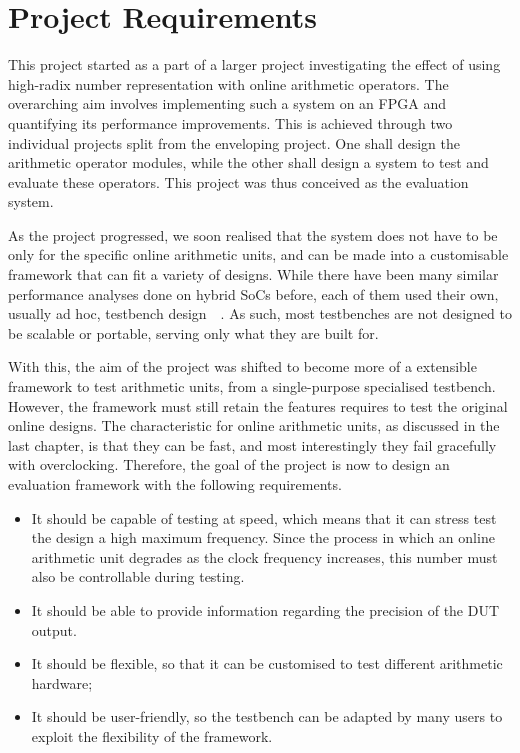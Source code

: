 \chapter{Project Requirements}

This project started as a part of a larger project investigating the effect of using high-radix number representation with online arithmetic operators.
The overarching aim involves implementing such a system on an FPGA and quantifying its performance improvements.
This is achieved through two individual projects split from the enveloping project.
One shall design the arithmetic operator modules, while the other shall design a system to test and evaluate these operators.
This project was thus conceived as the evaluation system.

As the project progressed, we soon realised that the system does not have to be only for the specific online arithmetic units, and can be made into a customisable framework that can fit a variety of designs.
While there have been many similar performance analyses done on hybrid SoCs before, each of them used their own, usually ad hoc, testbench design~\cite{Shi1}~\cite{Li1}.
As such, most testbenches are not designed to be scalable or portable, serving only what they are built for.

With this, the aim of the project was shifted to become more of a extensible framework to test arithmetic units, from a single-purpose specialised testbench.
However, the framework must still retain the features requires to test the original online designs.
The characteristic for online arithmetic units, as discussed in the last chapter, is that they can be fast, and most interestingly they fail gracefully with overclocking.
Therefore, the goal of the project is now to design an evaluation framework with the following requirements.

\begin{itemize}
  \setlength\itemsep{0pt}
  \item It should be capable of testing at speed, which means that it can stress test the design a high maximum frequency.
        Since the process in which an online arithmetic unit degrades as the clock frequency increases, this number must also be controllable during testing.
  \item It should be able to provide information regarding the precision of the DUT output.
  \item It should be flexible, so that it can be customised to test different arithmetic hardware;
  \item It should be user-friendly, so the testbench can be adapted by many users to exploit the flexibility of the framework.
\end{itemize}
